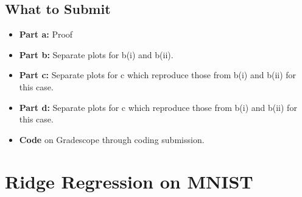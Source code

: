 \documentclass{article}
\begin{document}
\begin{aprob}
    \subsection*{What to Submit}
    \begin{itemize}
        \item \textbf{Part a:} Proof
        \item \textbf{Part b:} Separate plots for b(i) and b(ii).
        \item \textbf{Part c:} Separate plots for c which reproduce those from b(i) and b(ii) for this case.
        \item \textbf{Part d:} Separate plots for c which reproduce those from b(i) and b(ii) for this case.
        \item \textbf{Code} on Gradescope through coding submission.
    \end{itemize}
\end{aprob}

\section*{Ridge Regression on MNIST}
\end{document}

